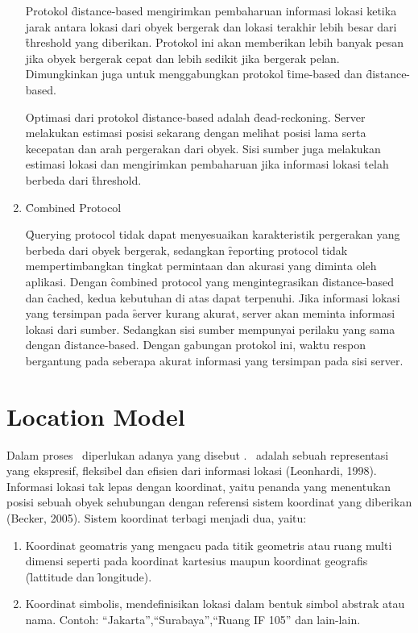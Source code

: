 \begin{enumerate}
        Protokol \f{distance-based} mengirimkan pembaharuan informasi lokasi
        ketika jarak antara lokasi dari obyek bergerak dan lokasi terakhir lebih
        besar dari \f{threshold} yang diberikan. Protokol ini akan memberikan
        lebih banyak pesan jika obyek bergerak cepat dan lebih sedikit jika
        bergerak pelan. Dimungkinkan juga untuk menggabungkan protokol
        \f{time-based} dan \f{distance-based}.

        Optimasi dari protokol \f{distance-based} adalah \f{dead-reckoning}.
        Server melakukan estimasi posisi sekarang dengan melihat posisi lama
        serta kecepatan dan arah pergerakan dari obyek. Sisi sumber juga
        melakukan estimasi lokasi dan mengirimkan pembaharuan jika informasi
        lokasi telah berbeda dari \f{threshold}.

    \item \f{Combined Protocol}

        \f{Querying protocol} tidak dapat menyesuaikan karakteristik pergerakan
        yang berbeda dari obyek bergerak, sedangkan \f{reporting protocol} tidak
        mempertimbangkan tingkat permintaan dan akurasi yang diminta oleh
        aplikasi. Dengan \f{combined protocol} yang mengintegrasikan
        \f{distance-based} dan \f{cached}, kedua kebutuhan di atas dapat
        terpenuhi. Jika informasi lokasi yang tersimpan pada \f{server} kurang
        akurat, server akan meminta informasi lokasi dari sumber.  Sedangkan
        sisi sumber mempunyai perilaku yang sama dengan \f{distance-based}.
        Dengan gabungan protokol ini, waktu respon bergantung pada seberapa
        akurat informasi yang tersimpan pada sisi server.

\end{enumerate}

\section{Location Model}
\label{sec:Location Model}

Dalam proses \tracking~diperlukan adanya yang disebut \locationmodel.
\LocationModel~adalah sebuah representasi yang ekspresif, fleksibel dan efisien
dari informasi lokasi (Leonhardi, 1998). Informasi lokasi tak lepas dengan
koordinat, yaitu penanda yang menentukan posisi sebuah obyek sehubungan dengan
referensi sistem koordinat yang diberikan (Becker, 2005). Sistem koordinat
terbagi menjadi dua, yaitu:

\begin{enumerate}
    \item Koordinat geomatris yang mengacu pada titik geometris atau ruang multi dimensi
        seperti pada koordinat kartesius maupun koordinat geografis (\f{lattitude} dan
        \f{longitude}).
    \item Koordinat simbolis, mendefinisikan lokasi dalam bentuk simbol abstrak atau
        nama. Contoh: ``Jakarta'',``Surabaya'',``Ruang IF 105'' dan lain-lain.
\end{enumerate}

